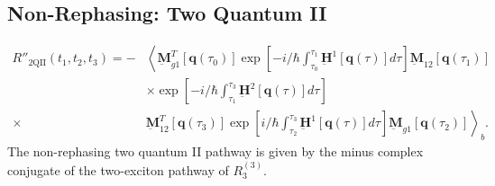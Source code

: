 \documentclass{article}
\newcommand{\bra}[1]{\ensuremath{\left\langle#1\right|}}
\newcommand{\ket}[1]{\ensuremath{\left|#1\right\rangle}}
\newcommand{\vect}[1]{\ensuremath{\boldsymbol{\mathbf{#1}}}}
\newcommand{\arw}{-{Latex[length=2mm]}}
\begin{document}
\subsection{Non-Rephasing: Two Quantum II}
\begin{figure}[h]
\centering
{}
\end{figure}
\begin{equation}
\begin{split}
 R''_\mathrm{2QII}(t_{1},t_{2},t_{3})=-
			  &\left\langle\underbar{\vect{M}}_{g1}^{T}[\vect q(\tau_{0})]\exp\left[-i/\hbar\int_{\tau_{0}}^{\tau_{1}}\underbar{\vect{H}}^{1}[\vect q(\tau)]d\tau\right] \underbar{\vect{M}}_{12} [\vect q(\tau_{1})]\right.\\
			  &\times\exp\left[-i/\hbar\int_{\tau_{1}}^{\tau_{3}}\underbar{\vect{H}}^{2}[\vect q(\tau)]d\tau\right]\\
			  \times&\left.\underbar{\vect{M}}_{12}^{T}[\vect q(\tau_{3})]\exp\left[i/\hbar\int_{\tau_{2}}^{\tau_{3}}\underbar{\vect{H}}^{1}[\vect q(\tau)]d\tau\right] \underbar{\vect{M}}_{g1} [\vect q(\tau_{2})]\right\rangle_{b}.
\end{split}
\end{equation}
The non-rephasing two quantum II pathway is given by the minus complex conjugate of the two-exciton pathway of $R_{3}^{(3)}$.\cite{Hamm2011}

\clearpage
\end{document}
